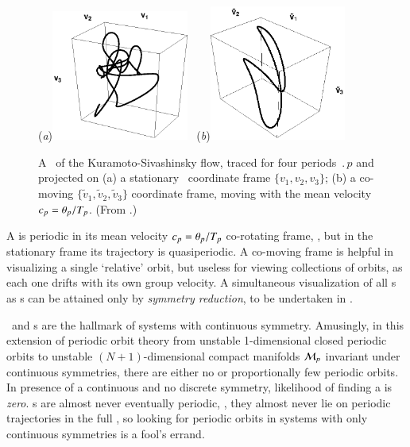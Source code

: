 \documentclass[final,number,sort&compress]{elsarticle}
\begin{document}
%
\begin{figure}[ht] \label{f:MeanVelocityFrame}
(\textit{a})\includegraphics[width=0.40\textwidth, clip=true]
                    {ks22rpo033.50_04.045E2.eps}
~(\textit{b})\includegraphics[width=0.40\textwidth, clip=true]
                     {ks22rpo033.50_04.045E2CM.eps}
\caption{
 A \rpo\ of the Kuramoto-Sivashinsky flow, traced for four periods
 $\period{p}$ and projected on
 (a) a stationary \statesp\ coordinate frame
 $\{v_1,v_2,v_3\}$;
 (b) a co-moving $\{\tilde{v}_1,\tilde{v}_2,\tilde{v}_3\}$
 coordinate frame, moving with the mean velocity
 $c_p={\bf \theta}_p/{T_{p}}$.
(From .)
}
\end{figure}
%
A \emph{\rpo} is periodic in its mean velocity
$c_p={\bf \theta}_p/{T_{p}}$ co-rotating frame,
, but in the stationary frame its
trajectory is quasiperiodic. A co-moving frame is helpful in
visualizing a single `relative' orbit, but useless for
viewing collections of orbits, as each one drifts with its
own group velocity. A simultaneous visualization of all \rpo
s as \po s {can  be attained} only by \emph{symmetry
reduction}, to be undertaken in .

\Reqva\ and \rpo s are the hallmark of systems with
continuous symmetry. Amusingly, in this extension of periodic
orbit theory from unstable 1-dim\-ens\-ion\-al closed
periodic orbits to unstable $(N\!+\!1)$-dim\-ens\-ion\-al
compact manifolds ${\cal M}_p$ in\-vari\-ant under continuous
symmetries, there are either no or proportionally few
periodic orbits. In presence of a continuous and no discrete
symmetry, likelihood of finding a {\po} is {\em zero}. \Rpo s
are almost never eventually periodic, \ie, they almost never
lie on periodic trajectories in the full {\statesp}, so
looking for periodic orbits in systems with only continuous
symmetries is a fool's errand.
\end{document}
